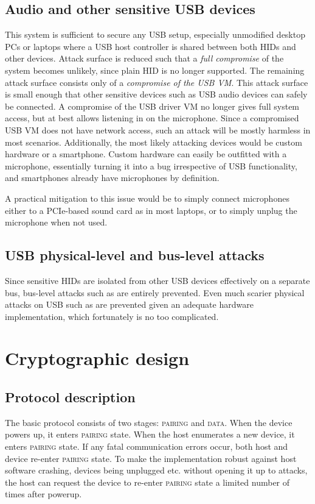 \documentclass[12pt,a4paper,notitlepage]{article}
\begin{document}
\subsection{Audio and other sensitive USB devices}
This system is sufficient to secure any USB setup, especially unmodified desktop PCs or laptops where a USB host
controller is shared between both HIDs and other devices. Attack surface is reduced such that a \emph{full compromise}
of the system becomes unlikely, since plain HID is no longer supported. The remaining attack surface consists only of a
\emph{compromise of the USB VM}. This attack surface is small enough that other sensitive devices such as USB audio
devices can safely be connected. A compromise of the USB driver VM no longer gives full system access, but at best
allows listening in on the microphone. Since a compromised USB VM does not have network access, such an attack will be
mostly harmless in most scenarios. Additionally, the most likely attacking devices would be custom hardware or a
smartphone. Custom hardware can easily be outfitted with a microphone, essentially turning it into a bug irrespective of
USB functionality, and smartphones already have microphones by definition.

A practical mitigation to this issue would be to simply connect microphones either to a PCIe-based sound card as in most
laptops, or to simply unplug the microphone when not used.

\subsection{USB physical-level and bus-level attacks}
Since sensitive HIDs are isolated from other USB devices effectively on a separate bus, bus-level attacks such as
\textcite{neugschwandtner01} are entirely prevented. Even much scarier physical attacks on USB such as \textcite{su01}
are prevented given an adequate hardware implementation, which fortunately is no too complicated.

\section{Cryptographic design}

\subsection{Protocol description}
\label{prot_desc}
The basic protocol consists of two stages: \textsc{pairing} and \textsc{data}. When the device powers up, it enters
\textsc{pairing} state. When the host enumerates a new device, it enters \textsc{pairing} state. If any fatal
communication errors occur, both host and device re-enter \textsc{pairing} state. To make the implementation robust
against host software crashing, devices being unplugged etc. without opening it up to attacks, the host can request the
device to re-enter \textsc{pairing} state a limited number of times after powerup.
\end{document}
